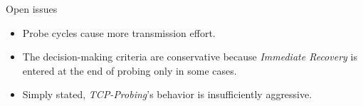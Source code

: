 \begin{frame}{Open issues}
       \begin{itemize}
	    \item Probe cycles cause more transmission effort.
	    \item The decision-making criteria are conservative
		  because \textit{Immediate Recovery} is entered at the end of
		  probing only in some cases.
	    \item Simply stated, \textit{TCP-Probing}'s
		  behavior is insufficiently aggressive.
       \end{itemize}
\end{frame}


